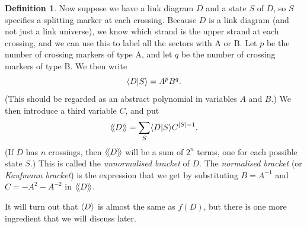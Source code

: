 \documentclass[reqno]{amsart}
\theoremstyle{definition}
\newtheorem{definition}[theorem]{Definition}
\begin{document}
\begin{definition}
 Now suppose we have a link diagram $D$ and a state $S$ of $D$, so $S$
 specifies a splitting marker at each crossing.  Because $D$ is a link
 diagram (and not just a link universe), we know which strand is the
 upper strand at each crossing, and we can use this to label all the
 sectors with A or B.  Let $p$ be the number of crossing markers of
 type A, and let $q$ be the number of crossing markers of type B.  We
 then write 
 \[ \langle D|S\rangle = A^pB^q. \]
 (This should be regarded as an abstract polynomial in variables $A$
 and $B$.)  We then introduce a third variable $C$, and put 
 \[ \langle\!\langle D\rangle\!\rangle = \sum_S\langle D|S\rangle C^{|S|-1}. \]
 (If $D$ has $n$ crossings, then $\langle\!\langle D\rangle\!\rangle$ will be a sum of $2^n$
 terms, one for each possible state $S$.)  This is called the
 \emph{unnormalised bracket} of $D$.  The \emph{normalised bracket}
 (or \emph{Kaufmann bracket}) is the expression that we get by
 substituting $B=A^{-1}$ and $C=-A^2-A^{-2}$ in $\langle\!\langle D\rangle\!\rangle$.
\end{definition}

It will turn out that $\langle D\rangle$ is almost the same as $f(D)$, but there
is one more ingredient that we will discuss later.  
\end{document}
